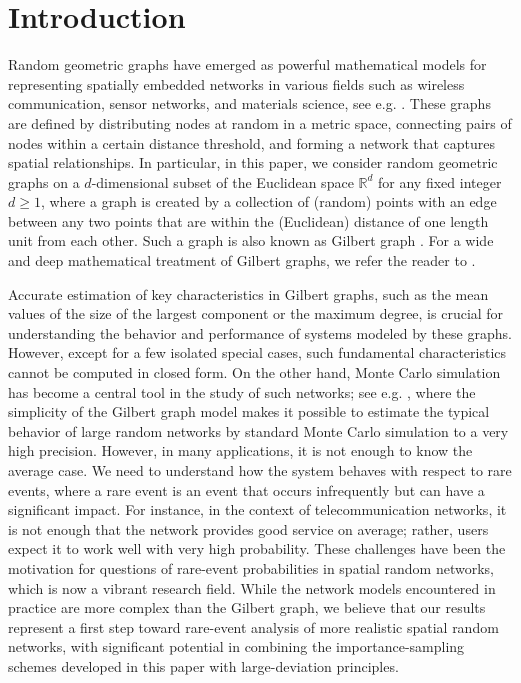 \documentclass[pdflatex, sn-mathphys-ay]{sn-jnl}%
\newcommand{\reals}{\mathbb{R}}
\theoremstyle{thmstyleone}%
\theoremstyle{thmstyletwo}%
\theoremstyle{thmstylethree}%
\begin{document}

\maketitle

\section{Introduction}\label{sec:intro}

Random geometric graphs have emerged as powerful mathematical models for representing spatially embedded networks in various fields such as wireless communication, sensor networks, and materials science, see e.g.  \cite{cov, baccelli2009stochastic1, baccelli2009stochastic2, bm, netCom,kenniche2010random, thm}. 
These graphs are defined by distributing nodes at random in a metric space, connecting pairs of nodes within a certain distance threshold, and forming a network that captures spatial relationships. In particular, in this paper, we consider random geometric graphs on a $d$-dimensional subset of the Euclidean space $\reals^d$ for any fixed integer $d\ge 1$, where a graph is created by a collection of (random) points with an edge between any two points that are within the (Euclidean) distance  of one length unit from each other. Such a graph is also known as  Gilbert graph \citep{gilbert}. For a wide and deep mathematical treatment of Gilbert graphs, we refer the reader to \cite{penrose}.

Accurate estimation of key characteristics in Gilbert graphs, such as the mean values of  the size of the largest component or the maximum degree, is crucial for understanding the behavior and performance of systems modeled by these graphs. However, except for a few isolated special cases, such fundamental characteristics cannot be computed in closed form. On the other hand, Monte Carlo simulation has become a central tool in the study of such networks; see e.g.  \cite{bb2,bb1}, where the simplicity of the Gilbert graph model makes it possible to estimate the typical behavior of large random networks by standard Monte Carlo simulation to a very high precision. However, in many applications, it is not enough to know the average case. We need to understand how the system behaves with respect to rare events, where a rare event is an event that occurs infrequently but can have a significant impact. For instance, in the context of telecommunication networks, it is not enough that the network provides good service on average; rather, users expect it to work well with very high probability. These challenges have been the motivation for questions of rare-event probabilities in spatial random networks, which is now a vibrant research field. {While the network models encountered in practice are more complex than the Gilbert graph, we believe that our results represent a first step toward rare-event analysis of more realistic spatial random networks, with significant potential in combining the importance-sampling schemes developed in this paper with large-deviation principles.}
\end{document}
